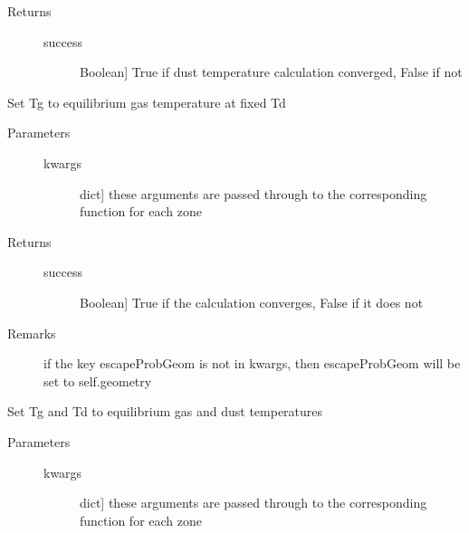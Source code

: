 \documentclass[letterpaper,10pt,english]{sphinxmanual}
\begin{document}
\begin{fulllineitems}
\begin{fulllineitems}
\begin{description}
\begin{description}
\end{description}

\item[{Returns}] \leavevmode\begin{description}
\item[{success}] \leavevmode{[}Boolean{]}
True if dust temperature calculation converged, False if
not

\end{description}

\end{description}

\end{fulllineitems}


\begin{fulllineitems}
\label{fulldoc:despotic.zonedcloud.setGasTempEq}
Set Tg to equilibrium gas temperature at fixed Td
\begin{description}
\item[{Parameters}] \leavevmode\begin{description}
\item[{kwargs}] \leavevmode{[}dict{]}
these arguments are passed through to the corresponding
function for each zone

\end{description}

\item[{Returns}] \leavevmode\begin{description}
\item[{success}] \leavevmode{[}Boolean{]}
True if the calculation converges, False if it does not

\end{description}

\item[{Remarks}] \leavevmode
if the key escapeProbGeom is not in kwargs, then
escapeProbGeom will be set to self.geometry

\end{description}

\end{fulllineitems}


\begin{fulllineitems}
\label{fulldoc:despotic.zonedcloud.setTempEq}
Set Tg and Td to equilibrium gas and dust temperatures
\begin{description}
\item[{Parameters}] \leavevmode\begin{description}
\item[{kwargs}] \leavevmode{[}dict{]}
these arguments are passed through to the corresponding
function for each zone


\end{description}
\end{description}
\end{fulllineitems}
\end{fulllineitems}
\end{document}
